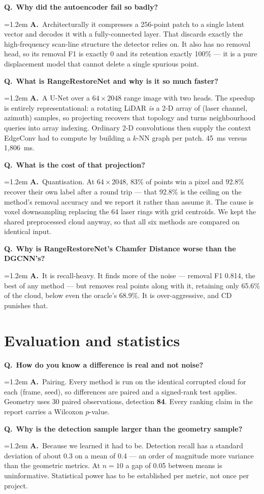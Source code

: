 \documentclass[11pt,a4paper]{article}
\newcommand{\Q}[1]{\medskip\noindent\textcolor{qcol}{\textbf{Q.}}\ \textbf{#1}\par\nopagebreak}
\newcommand{\A}[1]{\noindent\hangindent=1.2em\hangafter=0 \textcolor{inkcol}{\textbf{A.}}\ #1\par}
\begin{document}
\Q{Why did the autoencoder fail so badly?}
\A{Architecturally it compresses a 256-point patch to a single latent vector
and decodes it with a fully-connected layer. That discards exactly the
high-frequency scan-line structure the detector relies on. It also has no
removal head, so its removal F1 is exactly 0 and its retention exactly 100\%
--- it is a pure displacement model that cannot delete a single spurious
point.}

\Q{What is RangeRestoreNet and why is it so much faster?}
\A{A U-Net over a $64\times2048$ range image with two heads. The speedup is
entirely representational: a rotating LiDAR \emph{is} a 2-D array of (laser
channel, azimuth) samples, so projecting recovers that topology and turns
neighbourhood queries into array indexing. Ordinary 2-D convolutions then
supply the context EdgeConv had to compute by building a $k$-NN graph per
patch. 45~ms versus 1{,}806~ms.}

\Q{What is the cost of that projection?}
\A{Quantisation. At $64\times2048$, 83\% of points win a pixel and 92.8\%
recover their own label after a round trip --- that 92.8\% is the ceiling on
the method's removal accuracy and we report it rather than assume it. The
cause is voxel downsampling replacing the 64 laser rings with grid centroids.
We kept the shared preprocessed cloud anyway, so that all six methods are
compared on identical input.}

\Q{Why is RangeRestoreNet's Chamfer Distance worse than the DGCNN's?}
\A{It is recall-heavy. It finds more of the noise --- removal F1 0.814, the
best of any method --- but removes real points along with it, retaining only
65.6\% of the cloud, below even the oracle's 68.9\%. It is over-aggressive,
and CD punishes that.}

\section{Evaluation and statistics}

\Q{How do you know a difference is real and not noise?}
\A{Pairing. Every method is run on the identical corrupted cloud for each
(frame, seed), so differences are paired and a signed-rank test applies.
Geometry uses 30 paired observations, detection \textbf{84}. Every ranking
claim in the report carries a Wilcoxon $p$-value.}

\Q{Why is the detection sample larger than the geometry sample?}
\A{Because we learned it had to be. Detection recall has a standard deviation
of about 0.3 on a mean of 0.4 --- an order of magnitude more variance than
the geometric metrics. At $n=10$ a gap of 0.05 between means is
uninformative. Statistical power has to be established per metric, not once
per project.}
\end{document}
